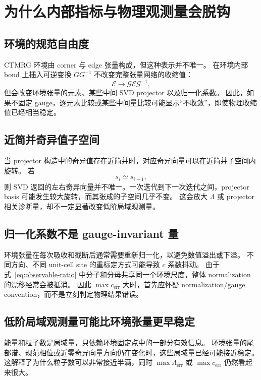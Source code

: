 \documentclass[11pt,a4paper]{ctexart}
\newcommand{\ctmrg}{CTMRG}
\begin{document}
\section{为什么内部指标与物理观测量会脱钩}

\subsection{环境的规范自由度}

\ctmrg{} 环境由 corner 与 edge 张量构成，但这种表示并不唯一。
在环境内部 bond 上插入可逆变换 $G G^{-1}$ 不改变完整张量网络的收缩值：
\begin{equation}
  \mathcal{E}
  \longrightarrow
  \mathcal{G}\mathcal{E}\mathcal{G}^{-1},
\end{equation}
但会改变环境张量的元素、某些中间 SVD projector 以及归一化系数。
因此，如果不固定 gauge，逐元素比较或某些中间量比较可能显示“不收敛”，即使物理收缩值已经相当稳定。

\subsection{近简并奇异值子空间}

当 projector 构造中的奇异值存在近简并时，对应奇异向量可以在近简并子空间内旋转。
若
\begin{equation}
  s_i \simeq s_{i+1},
\end{equation}
则 SVD 返回的左右奇异向量并不唯一。一次迭代到下一次迭代之间，projector basis 可能发生较大旋转，而其张成的子空间几乎不变。
这会放大 $\Lambda$ 或 projector 相关诊断量，却不一定显著改变低阶局域观测量。

\subsection{归一化系数不是 gauge-invariant 量}

环境张量在每次吸收和截断后通常需要重新归一化，以避免数值溢出或下溢。
不同方向、不同 unit-cell site 的重标定方式可能导致 $c$ 系数抖动。
由于式~\eqref{eq:observable-ratio} 中分子和分母共享同一个环境尺度，整体 normalization 的漂移经常会被抵消。
因此 $\max c_{\mathrm{err}}$ 大时，首先应怀疑 normalization/gauge convention，而不是立刻判定物理结果错误。

\subsection{低阶局域观测量可能比环境张量更早稳定}

能量和粒子数是局域量，只依赖环境固定点中的一部分有效信息。
环境张量的尾部谱、规范相位或近零奇异向量方向仍在变化时，这些局域量已经可能接近稳定。
这解释了为什么粒子数可以非常接近半满，同时 $\max\Lambda_{\mathrm{err}}$ 或 $\max c_{\mathrm{err}}$ 仍然看起来很大。
\end{document}
